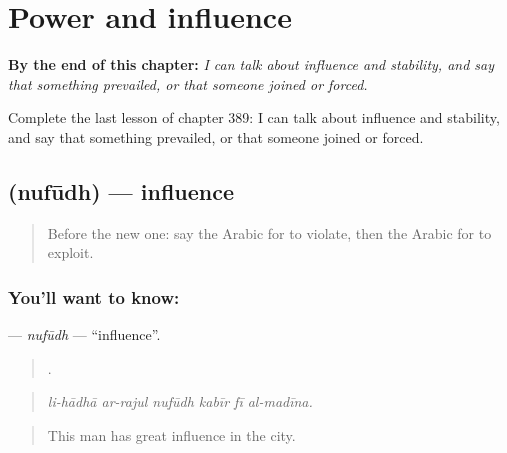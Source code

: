 
\chapter{Power and influence}
\label{ch:ar-power-and-influence}

\begin{chapteropening}
\textbf{By the end of this chapter:} \emph{I can talk about influence and stability, and say that something prevailed, or that someone joined or forced.}

Complete the last lesson of chapter 389: I can talk about influence and stability, and say that something prevailed, or that someone joined or forced.
\end{chapteropening}

\section[\texorpdfstring{\ar{نفوذ} (nufūdh)}{نفوذ (nufūdh)}]{ (nufūdh) — influence}

\label{lesson:AR-C389-nufudh}



\begin{quote}
Before the new one: say the Arabic for to violate, then the Arabic for to exploit.
\end{quote}

\subsection*{You'll want to know: }
\textbf{} — \emph{nufūdh} — \textquotedblleft{}influence\textquotedblright{}.

\begin{quote}
     .
\end{quote}

\begin{quote}
\emph{li-hādhā ar-rajul nufūdh kabīr fī al-madīna.}
\end{quote}

\begin{quote}
This man has great influence in the city.
\end{quote}


